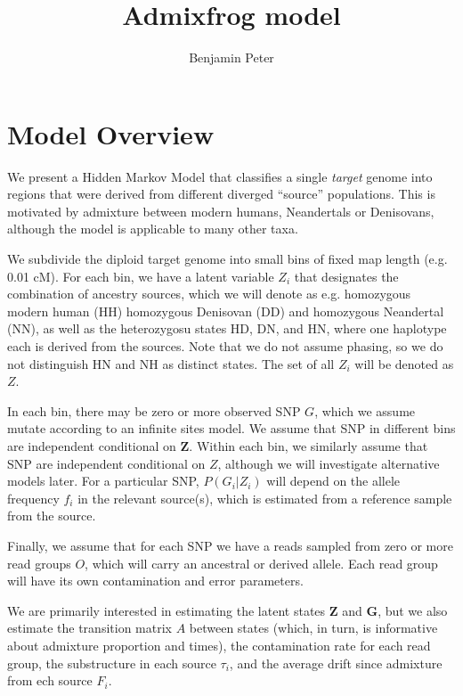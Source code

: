 \documentclass[10pt,a4paper]{article}
\author{Benjamin Peter}
\title{Admixfrog model}
\begin{document}
	\maketitle
\section*{Model Overview}

	We present a Hidden Markov Model that classifies a single \emph{target} genome into regions that were derived from different diverged ``source'' populations. This is motivated by admixture between modern humans, Neandertals or Denisovans, although the model is applicable to many other taxa. 
	
	We subdivide the diploid target genome into small bins of fixed map length (e.g. 0.01 cM). For each bin, we have a latent variable $Z_i$ that designates the combination of ancestry sources, which we will denote as e.g. homozygous modern human (HH) homozygous Denisovan (DD) and homozygous Neandertal (NN), as well as the heterozygosu states HD, DN, and HN, where one haplotype each is derived from the sources. Note that we do not assume phasing, so we do not distinguish HN and NH as distinct states. The set of all $Z_i$ will be denoted as $Z$.
	
	In each bin, there may be zero or more observed SNP $G$, which we assume mutate according to an infinite sites model. We assume that SNP in different bins are independent conditional on $\mathbf{Z}$. Within each bin, we similarly assume that SNP are independent conditional on $Z$, although we will investigate alternative models later. For a particular SNP, $P(G_i | Z_i)$ will depend on the allele frequency $f_i$ in the relevant source(s), which is estimated from a reference sample from the source.
	
	Finally, we assume that for each SNP we have a reads sampled from zero or more read groups $O$, which will carry an ancestral or derived allele. Each read group will have its own contamination and error parameters.
	
	We are primarily interested in estimating the latent states $\mathbf{Z}$ and $\mathbf{G}$, but we also estimate the transition matrix $A$ between states (which, in turn, is informative about admixture proportion and times), the contamination rate for each read group, the substructure in each source $\tau_i$, and the average drift since admixture from ech source $F_i$. 
\end{document}
